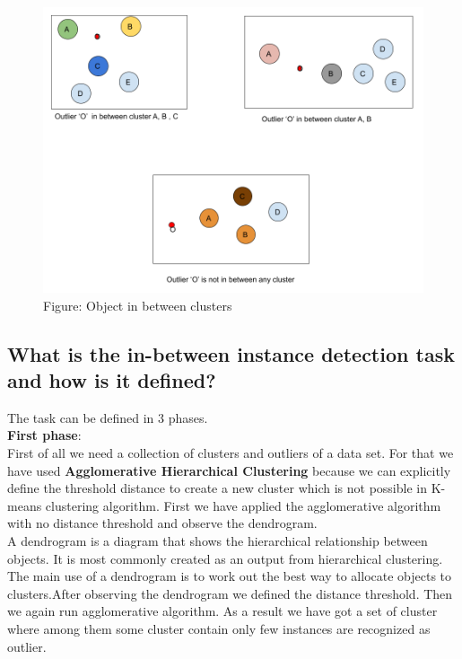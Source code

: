 \documentclass[11pt]{article}
\theoremstyle{definition}
\begin{document}
\begin{figure}[H]
\centering
\includegraphics[scale=.4]{images/Object-in-btwn-cluster.png}\\
Figure: Object in between clusters
\end{figure}

\subsection{What is the in-between instance detection \textbf{task} and how is it defined?}

The task can be defined in 3 phases.\\
\textbf{First phase}:\\
First of all we need a collection of clusters and outliers of a data set. For that we have used \textbf{Agglomerative Hierarchical Clustering} because we can explicitly define the threshold distance to create a new cluster which is not possible in K-means clustering algorithm. First we have applied the agglomerative algorithm with no distance threshold and observe the dendrogram. \\

A dendrogram is a diagram that shows the hierarchical relationship between objects. It is most commonly created as an output from hierarchical clustering. The main use of a dendrogram is to work out the best way to allocate objects to clusters.After observing the dendrogram we defined the distance threshold. Then we again run agglomerative algorithm. As a result we have got a set of cluster where among them some cluster contain only few instances are recognized as outlier.\\
\end{document}
